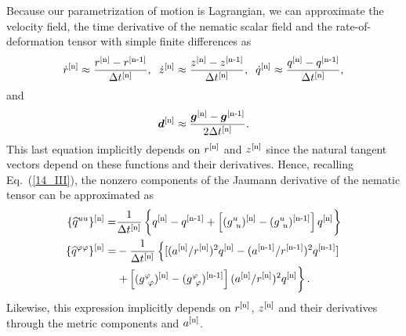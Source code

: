 Because our parametrization of motion is  Lagrangian, we can approximate the velocity field, the time derivative of the nematic scalar field and the rate-of-deformation tensor with simple finite differences as
\begin{equation}
  \dot{r}^{[\textup{n}]} \approx \frac{r^{[\textup{n}]} - r^{[\textup{n-1}]}}{\Delta t^{[\textup{n}]}},\;\;
  \dot{z}^{[\textup{n}]} \approx \frac{z^{[\textup{n}]} - z^{[\textup{n-1}]}}{\Delta t^{[\textup{n}]}},\;\;
  \dot{q}^{[\textup{n}]} \approx \frac{q^{[\textup{n}]} - q^{[\textup{n-1}]}}{\Delta t^{[\textup{n}]}},
\end{equation}
and 
\begin{equation}
  \bm{d}^{[\textup{n}]} \approx \frac{\bm{g}^{[\textup{n}]} - \bm{g}^{[\textup{n-1}]}}{2 \Delta t^{[\textup{n}]}}.
\end{equation}
This last equation implicitly depends on $r^{[\textup{n}]}$ and $z^{[\textup{n}]}$ since the natural tangent vectors depend on these functions and their derivatives. Hence, recalling Eq.~(\ref{14_III}), the nonzero components of the Jaumann derivative of the nematic tensor can be approximated as
\begin{align} 
    \{\widehat{q}^{uu}\}^{[\textup{n}]}   = & \frac{1}{\Delta t^{[\textup{n}]}} \left\{
q^{[\textup{n}]} - q^{[\textup{n-1}]} + \left[(g^{u}_{~u})^{[\textup{n}]} - (g^{u}_{~u})^{[\textup{n-1}]}\right] q^{[\textup{n}]}  \right\} \\
    \{\widehat{q}^{\varphi\varphi}\}^{[\textup{n}]}   = & - \frac{1}{\Delta t^{[\textup{n}]}}  \left\{ [(a^{[\textup{n}]}/r^{[\textup{n}]})^2 q^{[\textup{n}]} - (a^{[\textup{n-1}]}/r^{[\textup{n-1}]})^2 q^{[\textup{n-1}]}] \right.\\
    & \left.  + \left[(g^{\varphi}_{~\varphi})^{[\textup{n}]} - (g^{\varphi}_{~\varphi})^{[\textup{n-1}]}\right](a^{[\textup{n}]}/r^{[\textup{n}]})^2 q^{[\textup{n}]} \right\}. \nonumber
\end{align}
Likewise, this expression implicitly depends on $r^{[\textup{n}]}$, $z^{[\textup{n}]}$ and their derivatives through the metric components and $a^{[\textup{n}]}$.


